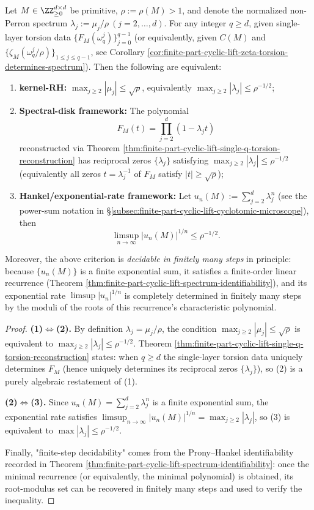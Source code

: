 \begin{theorem}\label{thm:finite-part-single-layer-torsion-near-rh}
Let \(M\in\ZZ_{\ge0}^{d\times d}\) be primitive, \(\rho:=\rho(M)>1\), and denote the normalized non-Perron spectrum \(\lambda_j:=\mu_j/\rho\ (j=2,\dots,d)\).
For any integer \(q\ge d\), given single-layer torsion data \(\{F_M(\omega_q^j)\}_{j=0}^{q-1}\) (or equivalently, given \(C(M)\) and \(\{\zeta_M(\omega_q^j/\rho)\}_{1\le j\le q-1}\), see Corollary \ref{cor:finite-part-cyclic-lift-zeta-torsion-determines-spectrum}).
Then the following are equivalent:
\begin{enumerate}
  \item \textbf{kernel-RH:} \(\max_{j\ge2}|\mu_j|\le \sqrt{\rho}\), equivalently \(\max_{j\ge2}|\lambda_j|\le \rho^{-1/2}\);
  \item \textbf{Spectral-disk framework:} The polynomial
  \[
  F_M(t)=\prod_{j=2}^{d}(1-\lambda_j t)
  \]
  reconstructed via Theorem \ref{thm:finite-part-cyclic-lift-single-q-torsion-reconstruction} has reciprocal zeros \(\{\lambda_j\}\) satisfying \(\max_{j\ge2}|\lambda_j|\le \rho^{-1/2}\) (equivalently all zeros \(t=\lambda_j^{-1}\) of \(F_M\) satisfy \(|t|\ge \sqrt{\rho}\));
  \item \textbf{Hankel/exponential-rate framework:} Let \(u_n(M):=\sum_{j=2}^{d}\lambda_j^{n}\) (see the power-sum notation in \S\ref{subsec:finite-part-cyclic-lift-cyclotomic-microscope}), then
  \[
  \limsup_{n\to\infty}|u_n(M)|^{1/n}\le \rho^{-1/2}.
  \]
\end{enumerate}
Moreover, the above criterion is \emph{decidable in finitely many steps} in principle: because \(\{u_n(M)\}\) is a finite exponential sum, it satisfies a finite-order linear recurrence (Theorem \ref{thm:finite-part-cyclic-lift-spectrum-identifiability}), and its exponential rate \(\limsup |u_n|^{1/n}\) is completely determined in finitely many steps by the moduli of the roots of this recurrence's characteristic polynomial.
\end{theorem}
\begin{proof}
\textbf{(1)\(\Leftrightarrow\)(2).}
By definition \(\lambda_j=\mu_j/\rho\), the condition \(\max_{j\ge2}|\mu_j|\le \sqrt{\rho}\) is equivalent to \(\max_{j\ge2}|\lambda_j|\le \rho^{-1/2}\).
Theorem \ref{thm:finite-part-cyclic-lift-single-q-torsion-reconstruction} states: when \(q\ge d\) the single-layer torsion data uniquely determines \(F_M\) (hence uniquely determines its reciprocal zeros \(\{\lambda_j\}\)), so (2) is a purely algebraic restatement of (1).
\par
\textbf{(2)\(\Leftrightarrow\)(3).}
Since \(u_n(M)=\sum_{j=2}^{d}\lambda_j^n\) is a finite exponential sum, the exponential rate satisfies
\(
\limsup_{n\to\infty}|u_n(M)|^{1/n}=\max_{j\ge2}|\lambda_j|
\),
so (3) is equivalent to \(\max|\lambda_j|\le\rho^{-1/2}\).
\par
Finally, "finite-step decidability" comes from the Prony--Hankel identifiability recorded in Theorem \ref{thm:finite-part-cyclic-lift-spectrum-identifiability}: once the minimal recurrence (or equivalently, the minimal polynomial) is obtained, its root-modulus set can be recovered in finitely many steps and used to verify the inequality.
\end{proof}
